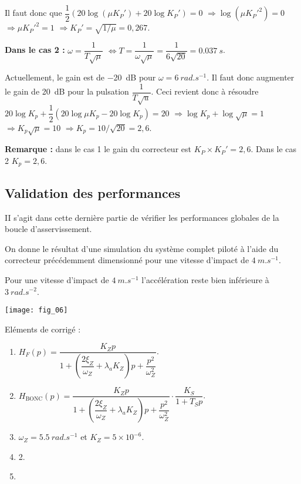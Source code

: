 \begin{multicols}{2}
\begin{multicols}{2}
\begin{corrige}
Il faut donc que $\dfrac{1}{2}\left( 20\log\left( \mu K_P'\right) + 20\log K_P'  \right)=0 $ 
$\Rightarrow \log\left( \mu K_P'^2\right)  =0$
$\Rightarrow  \mu K_P'^2 =1$
$\Rightarrow   K_P' =\sqrt{1/\mu}=0,267$.

\textbf{Dans le cas 2 :}
$\omega=\dfrac{1}{T\sqrt{\mu}}$ $ \Leftrightarrow T=\dfrac{1}{\omega\sqrt{\mu}}=\dfrac{1}{6\sqrt{20}}=\SI{0,037}{s}$.

Actuellement, le gain est de \SI{-20}{dB} pour $\omega=\SI{6}{rad.s^{-1}}$. Il faut donc augmenter le gain de \SI{20}{dB} pour la pulsation $\dfrac{1}{T\sqrt{u}}$. Ceci revient donc à résoudre 
$20\log K_p + \dfrac{1}{2}\left( 20\log \mu K_p  - 20\log K_p \right) = 20$
$\Rightarrow \log K_p +  \log \sqrt{\mu}= 1$
$\Rightarrow  K_p \sqrt{\mu}= 10$
$\Rightarrow  K_p = 10/\sqrt{20}=2,6$.

\textbf{Remarque : } dans le cas 1 le gain du correcteur est $K_P\times K_P' = 2,6$. Dans le cas 2  $K_p=2,6$. 

\end{corrige}
\else
\fi

\subsection*{Validation des performances}

\begin{obj}
II s'agit dans cette dernière partie de vérifier les performances globales de la boucle d'asservissement.
\end{obj}
\ifprof
\else
On donne le résultat d'une simulation du système complet piloté à l'aide du correcteur précédemment dimensionné pour une vitesse d'impact de $\SI{4}{m.s^{-1}}$.
\fi

\ifprof
\begin{corrige}
Pour une vitesse d'impact de $\SI{4}{m.s^{-1}}$ l'accélération reste bien inférieure à $\SI{3}{rad.s^{-2}}$.
\end{corrige}
\else
\fi

\ifprof
\else
\begin{center}
\texttt{[image: fig\_06]}
\end{center}

\fi



\ifprof
\else
\ifcolle
\else
Eléments de corrigé : 
\begin{enumerate}
\item $H_F(p)= \dfrac{K_Z p}{ 1+\left(\dfrac{2\xi_Z}{\omega_Z}+\lambda_a K_Z\right)p+\dfrac{p^2}{\omega_Z^2} }$.
\item $H_{\text{BONC}}(p) = \dfrac{K_Z p}{ 1+\left(\dfrac{2\xi_Z}{\omega_Z}+\lambda_a K_Z\right)p+\dfrac{p^2}{\omega_Z^2} } \cdot \dfrac{K_S}{1+T_Sp} $.
\item $\omega_Z= \SI{5,5}{rad.s^{-1}}$ et $K_Z=5\times 10^{-6}$.
\item 2.
\item 
\end{enumerate}
\fi
\fi



\end{multicols}
\end{multicols}

